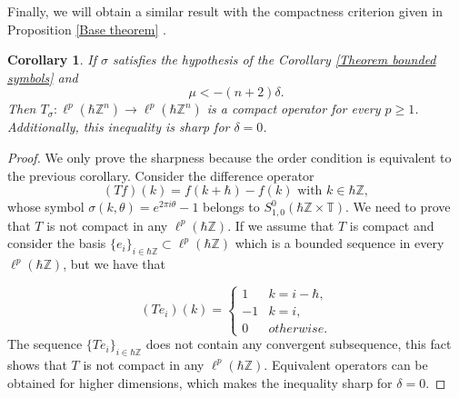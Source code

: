 \documentclass[pdflatex,sn-mathphys-num]{sn-jnl}%
\theoremstyle{thmstyleone}%
\newtheorem{corollary}{Corollary}
\theoremstyle{thmstyletwo}%
\theoremstyle{thmstylethree}%
\begin{document}
\indent Finally, we will obtain a similar result with the compactness criterion given in Proposition \ref{Base theorem} .

\begin{corollary}\label{compact criterion}
    If $\sigma$ satisfies the hypothesis of the Corollary \ref{Theorem bounded symbols} and 
    \[\mu<-(n+2)\delta.\]
    Then $T_\sigma:\ell^p(\hbar\mathbb{Z}^n)\to\ell^p(\hbar\mathbb{Z}^n)$ is a compact operator for every $ p\geq 1$. Additionally, this inequality is sharp for $\delta=0$.
\end{corollary}
\begin{proof}
    We only prove the sharpness because the order condition is equivalent to the previous corollary. Consider the difference operator
    \[(Tf)(k)=f(k+\hbar)-f(k) \text{ with } k\in \hbar\mathbb{Z},\]
     whose symbol $\sigma(k,\theta)=e^{2\pi i \theta} -1 $ belongs to $S^0_{1,0}(\hbar\mathbb{Z}\times\mathbb{T})$. We need to prove that $T$ is not compact in any $\ell^p(\hbar\mathbb{Z})$. If we assume that $T$ is compact and consider the basis $\{e_i\}_{i\in\hbar\mathbb{Z}}\subset \ell^p(\hbar\mathbb{Z})$ which is a bounded sequence in every $\ell^p(\hbar\mathbb{Z})$, but we have that 
    
    \[ (Te_i)(k)=  \begin{cases} 
      1 & k=i-\hbar, \\
      -1 & k=i, \\
      0 & otherwise. 
   \end{cases}
\]
    The sequence $\{Te_i\}_{i\in\hbar\mathbb{Z}}$ does not contain any convergent subsequence, this fact shows that $T$ is not compact in any $\ell^p(\hbar\mathbb{Z})$. Equivalent operators can be obtained for higher dimensions, which makes the inequality sharp for $\delta=0$. 
    
\end{proof}
\end{document}
